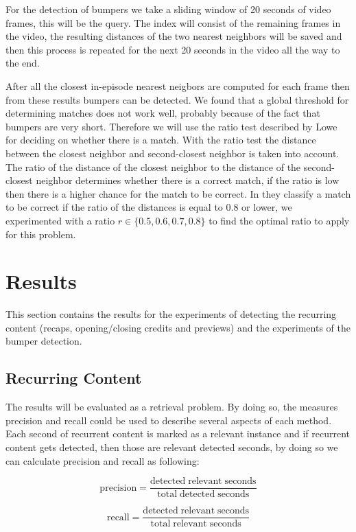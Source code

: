 \documentclass{article}
\begin{document}
For the detection of bumpers we take a sliding window of 20 seconds of video frames, this will be the query. The index will consist of the remaining frames in the video, the resulting distances of the two nearest neighbors will be saved and then this process is repeated for the next 20 seconds in the video all the way to the end.

After all the closest in-episode nearest neigbors are computed for each frame then from these results bumpers can be detected. We found that a global threshold for determining matches does not work well, probably because of the fact that bumpers are very short. Therefore we will use the ratio test described by Lowe \cite{lowe2004distinctive} for deciding on whether there is a match. With the ratio test the distance between the closest neighbor and second-closest neighbor is taken into account. The ratio of the distance of the closest neighbor to the distance of the second-closest neighbor determines whether there is a correct match, if the ratio is low then there is a higher chance for the match to be correct. In \cite{lowe2004distinctive} they classify a match to be correct if the ratio of the distances is equal to 0.8 or lower, we experimented with a ratio $r \in \{0.5, 0.6, 0.7, 0.8\}$ to find the optimal ratio to apply for this problem.


\section{Results} \label{results}
This section contains the results for the experiments of detecting the recurring content (recaps, opening/closing credits and previews) and the experiments of the bumper detection.

\subsection{Recurring Content}
The results will be evaluated as a retrieval problem. By doing so, the measures precision and recall could be used to describe several aspects of each method. Each second of recurrent content is marked as a relevant instance and if recurrent content gets detected, then those are relevant detected seconds, by doing so we can calculate precision and recall as following:

\[\mathrm{precision} = \frac{\mathrm{detected\;relevant\;seconds}}{\mathrm{total\;detected\;seconds}}\]

\[\mathrm{recall} = \frac{\mathrm{detected\;relevant\;seconds}}{\mathrm{total\;relevant\;seconds}}\]
\end{document}
